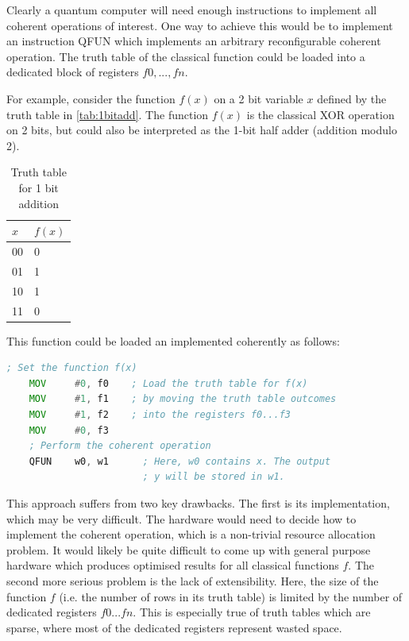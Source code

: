 Clearly a quantum computer will need enough instructions to implement all coherent operations of interest. One way to achieve this would be to implement an instruction QFUN which implements an arbitrary reconfigurable coherent operation. The truth table of the classical function could be loaded into a dedicated block of registers $f0,...,fn$. 

For example, consider the function $f(x)$ on a 2 bit variable $x$ defined by the truth table in \autoref{tab:1bitadd}. The function $f(x)$ is the classical XOR operation on 2 bits, but could also be interpreted as the 1-bit half adder (addition modulo 2).
\begin{table}[!htb]
    \caption{Truth table for 1 bit addition}
    \label{tab:1bitadd}
      \centering
        \begin{tabular}{|l||l|}
        \hline
        $x$ & $f(x)$ \\ \hline
        00  & 0      \\ 
        01  & 1       \\ 
        10  & 1       \\ 
        11  & 0       \\
        \hline
    \end{tabular}
\end{table}
This function could be loaded an implemented coherently as follows:
\begin{lstlisting}[language=asm]
    ; Set the function f(x)
    MOV     #0, f0    ; Load the truth table for f(x)
    MOV     #1, f1    ; by moving the truth table outcomes
    MOV     #1, f2    ; into the registers f0...f3
    MOV     #0, f3
    ; Perform the coherent operation
    QFUN    w0, w1      ; Here, w0 contains x. The output
                        ; y will be stored in w1.
\end{lstlisting}

This approach suffers from two key drawbacks. The first is its implementation, which may be very difficult. The hardware would need to decide how to implement the coherent operation, which is a non-trivial resource allocation problem. It would likely be quite difficult to come up with general purpose hardware which produces optimised results for all classical functions $f$. The second more serious problem is the lack of extensibility. Here, the size of the function $f$ (i.e. the number of rows in its truth table) is limited by the number of dedicated registers $f0...fn$. This is especially true of truth tables which are sparse, where most of the dedicated registers represent wasted space. 


